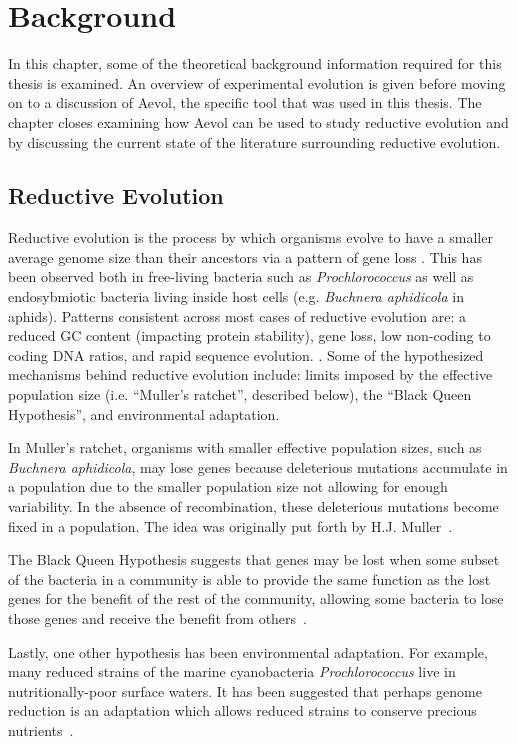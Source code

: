 \chapter{Background}\label{ch:02background}

In this chapter, some of the theoretical background information required for this thesis is examined. An overview of experimental evolution is given before moving on to a discussion of Aevol, the specific tool that was used in this thesis. The chapter closes examining how Aevol can be used to study reductive evolution and by discussing the current state of the literature surrounding reductive evolution.  

\section{Reductive Evolution}\label{reductive_evolution}
Reductive evolution is the process by which organisms evolve to have a smaller average genome size than their ancestors via a pattern of gene loss \cite{wilcox2003consequences}. This has been observed both in free-living bacteria such as \textit{Prochlorococcus} as well as endosybmiotic bacteria living inside host cells (e.g. \textit{Buchnera aphidicola} in aphids). Patterns consistent across most cases of reductive evolution are: a reduced GC content (impacting protein stability), gene loss, low non-coding to coding DNA ratios, and rapid sequence evolution.  \cite{Batut.2014}. Some of the hypothesized mechanisms behind reductive evolution include: limits imposed by the effective population size (i.e. ``Muller's ratchet'', described below), the ``Black Queen Hypothesis'', and environmental adaptation. 

In Muller's ratchet, organisms with smaller effective population sizes, such as \textit{Buchnera aphidicola}, may lose genes because deleterious mutations accumulate in a population due to the smaller population size not allowing for enough variability. In the absence of recombination, these deleterious mutations become fixed in a population. The idea was originally put forth by H.J. Muller~\cite{MullersRatchet}.


The Black Queen Hypothesis suggests that genes may be lost when some subset of the bacteria in a community is able to provide the same function as the lost genes for the benefit of the rest of the community, allowing some bacteria to lose those genes and receive the benefit from others~\cite{morris2012black}. 

Lastly, one other hypothesis has been environmental adaptation. For example, many reduced strains of the marine cyanobacteria \textit{Prochlorococcus} live in nutritionally-poor surface waters. It has been suggested that perhaps genome reduction is an adaptation which allows reduced strains to conserve precious nutrients~\cite{rocap2003genome, dufresne2005accelerated}. 



